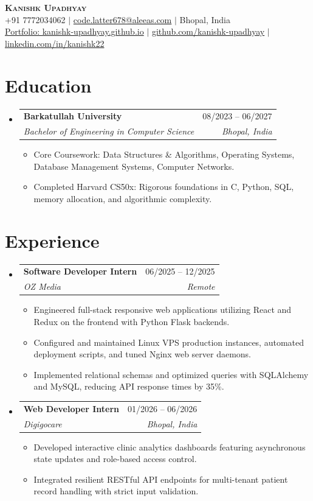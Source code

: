 \documentclass[letterpaper,10pt]{article}
\makeatletter
\newcommand{\resumeItem}[1]{\item\small{{#1 \vspace{-2pt}}}}
\newcommand{\resumeSubheading}[4]{
  \vspace{-2pt}\item
    \begin{tabular*}{0.97\textwidth}[t]{l@{\extracolsep{\fill}}r}
      \textbf{#1} & #2 \\
      \textit{\small#3} & \textit{\small #4} \\
    \end{tabular*}\vspace{-7pt}
}
\newcommand{\resumeSubHeadingListStart}{\begin{itemize}[leftmargin=0.15in, label={}]}
\newcommand{\resumeSubHeadingListEnd}{\end{itemize}}
\newcommand{\resumeItemListStart}{\begin{itemize}}
\newcommand{\resumeItemListEnd}{\end{itemize}\vspace{-5pt}}
\makeatother
\begin{document}
\begin{center}
    \textbf{\Huge \scshape Kanishk Upadhyay} \\ \vspace{2pt}
    \small +91 7772034062 $|$ \href{mailto:code.latter678@aleeas.com}{code.latter678@aleeas.com} $|$ Bhopal, India \\
    \href{https://kanishk-upadhyay.github.io/}{Portfolio: kanishk-upadhyay.github.io} $|$ \href{https://github.com/kanishk-upadhyay}{github.com/kanishk-upadhyay} $|$ \href{https://linkedin.com/in/kanishk22}{linkedin.com/in/kanishk22}
\end{center}

\section{Education}
  \resumeSubHeadingListStart
    \resumeSubheading
      {Barkatullah University}{08/2023 -- 06/2027}
      {Bachelor of Engineering in Computer Science}{Bhopal, India}
      \resumeItemListStart
        \resumeItem{Core Coursework: Data Structures \& Algorithms, Operating Systems, Database Management Systems, Computer Networks.}
        \resumeItem{Completed Harvard CS50x: Rigorous foundations in C, Python, SQL, memory allocation, and algorithmic complexity.}
      \resumeItemListEnd
  \resumeSubHeadingListEnd

\section{Experience}
  \resumeSubHeadingListStart
    \resumeSubheading
      {Software Developer Intern}{06/2025 -- 12/2025}
      {OZ Media}{Remote}
      \resumeItemListStart
        \resumeItem{Engineered full-stack responsive web applications utilizing React and Redux on the frontend with Python Flask backends.}
        \resumeItem{Configured and maintained Linux VPS production instances, automated deployment scripts, and tuned Nginx web server daemons.}
        \resumeItem{Implemented relational schemas and optimized queries with SQLAlchemy and MySQL, reducing API response times by 35\%.}
      \resumeItemListEnd

    \resumeSubheading
      {Web Developer Intern}{01/2026 -- 06/2026}
      {Digigocare}{Bhopal, India}
      \resumeItemListStart
        \resumeItem{Developed interactive clinic analytics dashboards featuring asynchronous state updates and role-based access control.}
        \resumeItem{Integrated resilient RESTful API endpoints for multi-tenant patient record handling with strict input validation.}
      \resumeItemListEnd
  \resumeSubHeadingListEnd
\end{document}
